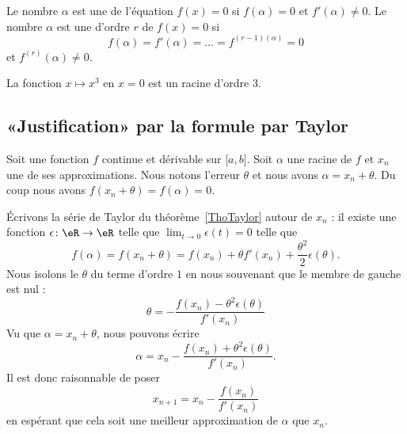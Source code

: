 \begin{definition}      \label{DEFooXSOQooAnWqKM}
    Le nombre \( \alpha\) est une  de l'équation \( f(x)=0\) si \( f(\alpha)=0\) et \( f'(\alpha)\neq 0\). Le nombre \( \alpha\) est une  d'ordre \( r\) de \( f(x)=0\) si
    \begin{equation}
        f(\alpha)=f'(\alpha)=\ldots=f^{(r-1)(\alpha)}=0
    \end{equation}
    et \( f^{(r)}(\alpha)\neq 0\).
\end{definition}

\begin{example}
    La fonction \( x\mapsto x^3\) en \( x=0\) est un racine d'ordre \( 3\).
\end{example}

\subsection{«Justification» par la formule par Taylor}

    Soit une fonction \( f\) continue et dérivable sur \( \mathopen[ a , b \mathclose]\). Soit \( \alpha\) une racine de \( f\) et \( x_n\) une de ses approximations.  Nous notons l'erreur \( \theta\) et nous avons \( \alpha=x_n+\theta\). Du coup nous avons \( f(x_n+\theta)=f(\alpha)=0\).

    Écrivons la série de Taylor du théorème~\ref{ThoTaylor} autour de \( x_n\) : il existe une fonction \( \epsilon\colon \eR\to \eR\) telle que \( \lim_{t\to 0} \epsilon(t)=0\) telle que
    \begin{equation}        \label{EQooOPUBooYaznay}
        f(\alpha)=f(x_n+\theta)=f(x_n)+\theta f'(x_n)+\frac{ \theta^2 }{ 2 }\epsilon(\theta).
    \end{equation}
    Nous isolons le \( \theta\) du terme d'ordre \( 1\) en nous souvenant que le membre de gauche est nul :
    \begin{equation}
        \theta=-\frac{ f(x_n)-\theta^2\epsilon(\theta) }{ f'(x_n) }
    \end{equation}
    Vu que \( \alpha=x_n+\theta\), nous pouvons écrire
    \begin{equation}
        \alpha=x_n-\frac{ f(x_n)+\theta^2\epsilon(\theta) }{ f'(x_n) }.
    \end{equation}
    Il est donc raisonnable de poser
    \begin{equation}
        x_{n+1}=x_n-\frac{ f(x_n) }{ f'(x_n) }
    \end{equation}
    en espérant que cela soit une meilleur approximation de \( \alpha\) que \( x_n\).

